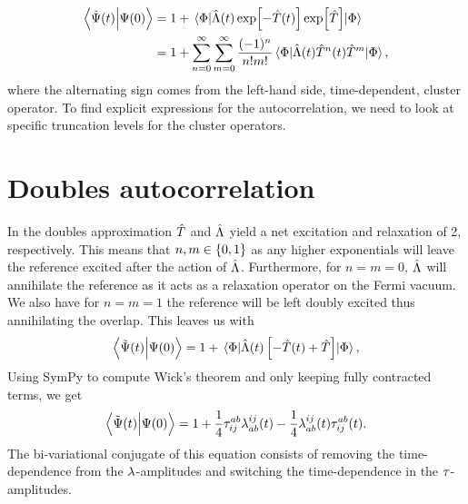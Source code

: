     \begin{align}
        \braket{\tilde{\Psi}(t)}{\Psi(0)}
        &=
        1
        +
        \mel{\Phi}{
            \hat{\Lambda}(t)
            \exp[-\hat{T}(t)]
            \exp[\hat{T}]
        }{\Phi}
        \\
        &=
        1
        + \sum_{n = 0}^{\infty}\sum_{m = 0}^{\infty}
        \frac{(-1)^{n}}{n!m!}
        \mel{\Phi}{
            \hat{\Lambda}(t)
            \hat{T}^n(t)
            \hat{T}^m
        }{\Phi},
        \label{eq:cc-autocorrelation}
    \end{align}
    where the alternating sign comes from the left-hand side, time-dependent,
    cluster operator.
    To find explicit expressions for the autocorrelation, we need to look at
    specific truncation levels for the cluster operators.

    \section{Doubles autocorrelation}
        In the doubles approximation $\hat{T}$ and $\hat{\Lambda}$ yield a net
        excitation and relaxation of 2, respectively.
        This means that $n, m \in \left\{ 0, 1 \right\}$ as any higher exponentials will
        leave the reference excited after the action of $\hat{\Lambda}$.
        Furthermore, for $n = m = 0$, $\hat{\Lambda}$ will annihilate the reference as
        it acts as a relaxation operator on the Fermi vacuum.
        We also have for $n = m = 1$ the reference will be left doubly excited
        thus annihilating the overlap.
        This leaves us with
        \begin{gather}
            \braket{\tilde{\Psi}(t)}{\Psi(0)}
            = 1
            + \mel{\Phi}{
                \hat{\Lambda}(t)\left[ 
                    -\hat{T}(t) + \hat{T}\right]
            }{\Phi},
        \end{gather}
        Using SymPy \cite{sympy} to compute Wick's theorem and only keeping
        fully contracted terms, we get
        \begin{gather}
            \braket{\tilde{\Psi}(t)}{\Psi(0)}
            = 1
            + \frac{1}{4}\tau^{ab}_{ij} \lambda^{ij}_{ab}(t)
            - \frac{1}{4}\lambda^{ij}_{ab}(t) \tau^{ab}_{ij}(t).
        \end{gather}
        The bi-variational conjugate of this equation consists of removing the
        time-dependence from the $\lambda$-amplitudes and switching the
        time-dependence in the $\tau$-amplitudes.

